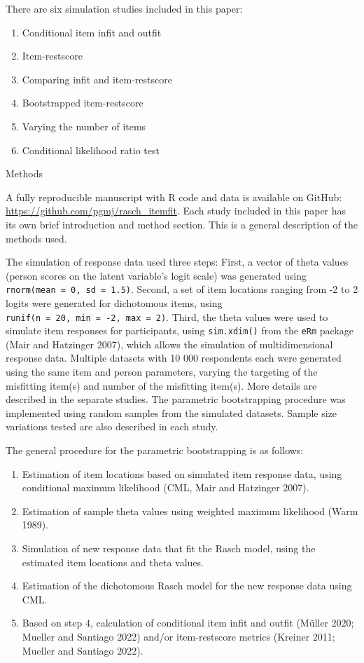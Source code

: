 \documentclass[
  letterpaper,
  DIV=11,
  numbers=noendperiod]{scrartcl}
\providecommand{\tightlist}{%
  \setlength{\itemsep}{0pt}\setlength{\parskip}{0pt}}\usepackage{longtable,booktabs,array}
\begin{document}
There are six simulation studies included in this paper:

\begin{enumerate}
\def\labelenumi{\arabic{enumi}.}
\tightlist
\item
  Conditional item infit and outfit
\item
  Item-restscore
\item
  Comparing infit and item-restscore
\item
  Bootstrapped item-restscore
\item
  Varying the number of items
\item
  Conditional likelihood ratio test
\end{enumerate}

Methods

A fully reproducible manuscript with R code and data is available on
GitHub: \url{https://github.com/pgmj/rasch_itemfit}. Each study included
in this paper has its own brief introduction and method section. This is
a general description of the methods used.

The simulation of response data used three steps: First, a vector of
theta values (person scores on the latent variable's logit scale) was
generated using \texttt{rnorm(mean\ =\ 0,\ sd\ =\ 1.5)}. Second, a set
of item locations ranging from -2 to 2 logits were generated for
dichotomous items, using
\texttt{runif(n\ =\ 20,\ min\ =\ -2,\ max\ =\ 2)}. Third, the theta
values were used to simulate item responses for participants, using
\texttt{sim.xdim()} from the \texttt{eRm} package (Mair and Hatzinger
2007), which allows the simulation of multidimensional response data.
Multiple datasets with 10 000 respondents each were generated using the
same item and person parameters, varying the targeting of the misfitting
item(s) and number of the misfitting item(s). More details are described
in the separate studies. The parametric bootstrapping procedure was
implemented using random samples from the simulated datasets. Sample
size variations tested are also described in each study.

The general procedure for the parametric bootstrapping is as follows:

\begin{enumerate}
\def\labelenumi{\arabic{enumi}.}
\tightlist
\item
  Estimation of item locations based on simulated item response data,
  using conditional maximum likelihood (CML, Mair and Hatzinger 2007).
\item
  Estimation of sample theta values using weighted maximum likelihood
  (Warm 1989).
\item
  Simulation of new response data that fit the Rasch model, using the
  estimated item locations and theta values.
\item
  Estimation of the dichotomous Rasch model for the new response data
  using CML.
\item
  Based on step 4, calculation of conditional item infit and outfit
  (Müller 2020; Mueller and Santiago 2022) and/or item-restscore metrics
  (Kreiner 2011; Mueller and Santiago 2022).
\end{enumerate}
\end{document}
